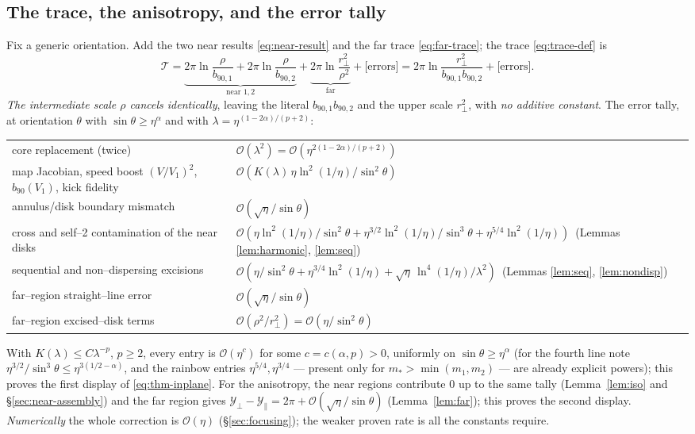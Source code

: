 \documentclass[11pt]{article}
\newcommand{\rp}{r_\perp}
\newcommand{\Yp}{\mathcal Y_\perp}
\newcommand{\Ypa}{\mathcal Y_\parallel}
\newcommand{\order}[1]{\mathcal O\!\left(#1\right)}
\begin{document}
\subsection{The trace, the anisotropy, and the error tally}
\label{sec:tally}
Fix a generic orientation. Add the two near results \eqref{eq:near-result} and the far trace
\eqref{eq:far-trace}; the trace \eqref{eq:trace-def} is
\begin{equation}
  \mathcal T
  =\underbrace{2\pi\ln\frac{\rho}{b_{90,1}}+2\pi\ln\frac{\rho}{b_{90,2}}}_{\text{near }1,2}
   +\underbrace{2\pi\ln\frac{\rp^2}{\rho^2}}_{\text{far}}
   +\big[\text{errors}\big]
  =2\pi\ln\frac{\rp^2}{b_{90,1}b_{90,2}}+\big[\text{errors}\big].
  \label{eq:assemble-trace}
\end{equation}
\emph{The intermediate scale $\rho$ cancels identically}, leaving the literal $b_{90,1}b_{90,2}$ and
the upper scale $\rp^2$, with \emph{no additive constant}. The error tally, at orientation $\theta$
with $\sin\theta\ge\eta^\alpha$ and with $\lambda=\eta^{(1-2\alpha)/(p+2)}$:
\begin{center}
\begin{tabular}{ll}
core replacement (twice) & $\order{\lambda^2}=\order{\eta^{2(1-2\alpha)/(p+2)}}$\\[2pt]
map Jacobian, speed boost $(V/V_1)^2$, $b_{90}(V_1)$, kick fidelity &
$\order{K(\lambda)\,\eta\ln^2(1/\eta)/\sin^2\theta}$\\[2pt]
annulus/disk boundary mismatch & $\order{\sqrt\eta/\sin\theta}$\\[2pt]
cross and self--2 contamination of the near disks & $\order{\eta\ln^2(1/\eta)/\sin^2\theta
+\eta^{3/2}\ln^2(1/\eta)/\sin^3\theta+\eta^{5/4}\ln^2(1/\eta)}$\ (Lemmas \ref{lem:harmonic}, \ref{lem:seq})\\[2pt]
sequential and non--dispersing excisions & $\order{\eta/\sin^2\theta
+\eta^{3/4}\ln^2(1/\eta)+\sqrt\eta\,\ln^4(1/\eta)/\lambda^2}$\ (Lemmas \ref{lem:seq}, \ref{lem:nondisp})\\[2pt]
far--region straight--line error & $\order{\sqrt\eta/\sin\theta}$\\[2pt]
far--region excised--disk terms & $\order{\rho^2/\rp^2}=\order{\eta/\sin^2\theta}$
\end{tabular}
\end{center}
With $K(\lambda)\le C\lambda^{-p}$, $p\ge2$, every entry is $\order{\eta^{c}}$ for some
$c=c(\alpha,p)>0$,
uniformly on $\sin\theta\ge\eta^\alpha$ (for the fourth line note
$\eta^{3/2}/\sin^3\theta\le\eta^{3(1/2-\alpha)}$, and the rainbow entries $\eta^{5/4},\eta^{3/4}$
--- present only for $m_*>\min(m_1,m_2)$ --- are already explicit powers); this proves the first
display of \eqref{eq:thm-inplane}.
For the anisotropy, the near regions contribute $0$ up to the same tally (Lemma~\ref{lem:iso} and
\S\ref{sec:near-assembly}) and the far region gives $\Yp-\Ypa=2\pi+\order{\sqrt\eta/\sin\theta}$
(Lemma~\ref{lem:far}); this proves the second display. \emph{Numerically} the whole correction is
$\order\eta$ (\S\ref{sec:focusing}); the weaker proven rate is all the constants require.
\end{document}
